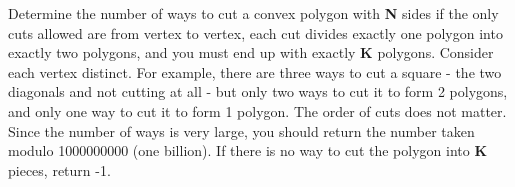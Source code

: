 Determine the number of ways to cut a convex polygon with \textbf{N} sides if the only cuts allowed are from vertex to vertex, each cut divides exactly one polygon into exactly two polygons, and you must end up with exactly \textbf{K} polygons. Consider each vertex distinct. For example, there are three ways to cut a square - the two diagonals and not cutting at all - but only two ways to cut it to form 2 polygons, and only one way to cut it to form 1 polygon. The order of cuts does not matter. Since the number of ways is very large, you should return the number taken modulo 1000000000 (one billion). If there is no way to cut the polygon into \textbf{K} pieces, return -1.